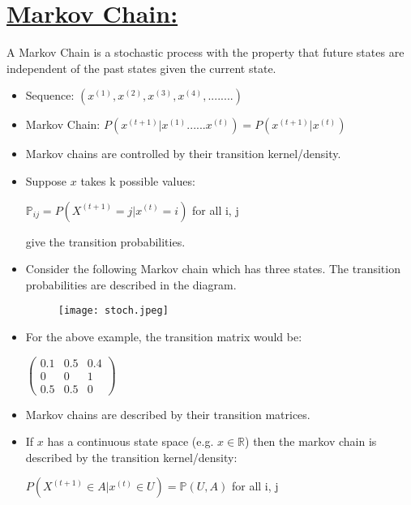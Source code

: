 \documentclass[12pt]{article}
\begin{document}
\section{\underline{Markov Chain:}}
 A Markov Chain is a stochastic process with the property that future states are independent of the past states given the current state.
\begin{itemize}
\item Sequence: $(x^{(1)}, x^{(2)}, x^{(3)}, x^{(4)}, ........)$
\item Markov Chain: $P(x^{(t+1)}| x^{(1)}......x^{(t)}) = P(x^{(t+1)}|x^{(t)})$
\item Markov chains are controlled by their transition kernel/density.
\item Suppose $x$ takes k possible values:
\begin{center}
$\mathbb{P}_{ij} = P(X^{(t+1)} = j | x^{(t)} = i)$ for all i, j\\
\end{center}
give the transition probabilities.
\item Consider the following Markov chain which has three states. The transition probabilities are described in the diagram. \\
\begin{figure}[h]
\center
\texttt{[image: stoch.jpeg]}
\end{figure}
\item For the above example, the transition matrix would be: \\
\begin{center}
$\left(\begin{matrix} 
0.1& 0.5& 0.4\\
0& 0& 1\\
0.5& 0.5& 0
\end{matrix}\right)$
\end{center}

\item Markov chains are described by their transition matrices.
\item If $x$ has a continuous state space (e.g. $x \in \mathbb{R}$) then the markov chain is described by the transition kernel/density:
\begin{center}
$P(X^{(t+1)} \in  A | x^{(t)} \in U) = \mathbb{P}(U,A)$ for all i, j\\
\end{center} 


\end{itemize}
\end{document}
